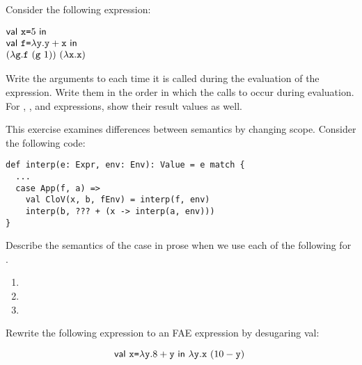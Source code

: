 \begin{exercise}

Consider the following expression:

$\begin{array}{@{}l}
\ebind{\cx}{5}{\\
    \ebind{\code{f}}{\efun{\cy}{\eadd{\cy}{\cx}}}{\\
        \eapp{(\efun{\code{g}}{\eapp{\code{f}}{(\eapp{\code{g}}{1})}})}
        {(\efun{\cx}{\cx})}
    }
}
\end{array}$

Write the arguments to  each time it is called during the
evaluation of the expression. Write them in the order in which the calls to
 occur during evaluation. For , , and
 expressions, show their result values as well.

\end{exercise}

\begin{exercise}

This exercise examines differences between semantics by changing scope.
Consider the following code:

\begin{verbatim}
def interp(e: Expr, env: Env): Value = e match {
  ...
  case App(f, a) =>
    val CloV(x, b, fEnv) = interp(f, env)
    interp(b, ??? + (x -> interp(a, env)))
}
\end{verbatim}

Describe the semantics of the  case in prose
when we use each of the following for .
\begin{enumerate}
  \item {}
  \item {}
  \item {}
\end{enumerate}

\end{exercise}

\begin{exercise}

Rewrite the following \Lang expression to an \textsf{FAE} expression by
desugaring \textsf{val}:

\[
  \textsf{val}\ \texttt{x}\texttt{=}\lambda\texttt{y}.8+\texttt{y}\ \textsf{in}\ \lambda\texttt{y}.\texttt{x}\ (10-\texttt{y})\ \]

\end{exercise}

